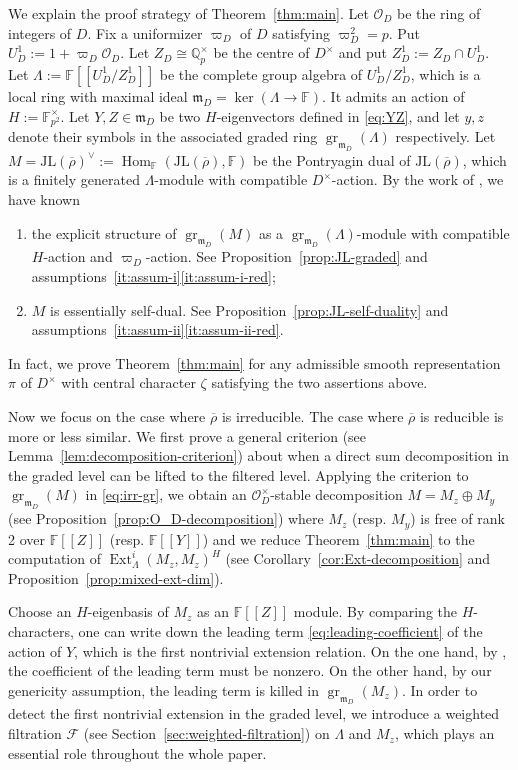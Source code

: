 \documentclass[11pt,a4paper]{article} %
\def\FF{\mathbb{F}}
\def\cF{\mathcal{F}}
\def\cO{\mathcal{O}}
\def\Ext{\operatorname{Ext}} %
\def\gr{\operatorname{gr}}
\def\Hom{\operatorname{Hom}}
\def\Qp{\mathbb{Q}_p}
\def\rhobar{\overline{\rho}}
\begin{document}
We explain the proof strategy of Theorem~\ref{thm:main}. Let $\cO_D$ be the ring of integers of $D$. Fix a uniformizer $\varpi_D$ of $D$ satisfying $\varpi_D^2=p$. Put $U_D^1:=1+\varpi_D\cO_D$. Let $Z_D\cong\Qp^\times$ be the centre of $D^{\times}$ and put $Z_D^1:=Z_D\cap U_D^1$. Let $\Lambda:=\FF[[U_D^1/Z_D^1]]$ be the complete group algebra of $U_D^1/Z_D^1$, which is a local ring with maximal ideal $\mathfrak{m}_D=\ker(\Lambda\rightarrow \mathbb{F})$. It admits an action of $H:=\FF_{p^2}^\times$. Let $Y,Z\in\mathfrak{m}_D$ be two $H$-eigenvectors defined in \eqref{eq:YZ}, and let $y,z$ denote their symbols in the associated graded ring $\gr_{\mathfrak{m}_D}(\Lambda)$ respectively. Let $M=\mathrm{JL}(\rhobar)^{\vee}:=\Hom_{\FF}(\mathrm{JL}(\rhobar),\FF)$ be the Pontryagin dual of $\mathrm{JL}(\rhobar)$, which is a finitely generated $\Lambda$-module with compatible $D^{\times}$-action. By the work of \cite{Koh17,HW24a,HW24b,HM26}, we have known
\begin{enumerate}[label=\alph*)]
    \item the explicit structure of $\gr_{\mathfrak{m}_D}(M)$ as a $\gr_{\mathfrak{m}_D}(\Lambda)$-module with compatible $H$-action and $\varpi_D$-action. See Proposition~\ref{prop:JL-graded} and assumptions~\ref{it:assum-i}\ref{it:assum-i-red};
    \item $M$ is essentially self-dual. See Proposition~\ref{prop:JL-self-duality} and assumptions~\ref{it:assum-ii}\ref{it:assum-ii-red}.
\end{enumerate}
In fact, we prove Theorem~\ref{thm:main} for any admissible smooth representation $\pi$ of $D^\times$ with central character $\zeta$ satisfying the two assertions above.

Now we focus on the case where $\rhobar$ is irreducible. The case where $\rhobar$ is reducible is more or less similar. We first prove a general criterion (see Lemma~\ref{lem:decomposition-criterion}) about when a direct sum decomposition in the graded level can be lifted to the filtered level. Applying the criterion to $\gr_{\mathfrak{m}_D}(M)$ in \eqref{eq:irr-gr}, we obtain an $\cO_D^{\times}$-stable decomposition $M=M_z\oplus M_y$ (see Proposition~\ref{prop:O_D-decomposition}) where $M_z$ (resp. $M_y$) is free of rank 2 over $\FF[[Z]]$ (resp. $\FF[[Y]]$) and we reduce Theorem~\ref{thm:main} to the computation of $\Ext^i_\Lambda(M_z,M_z)^H$ (see Corollary~\ref{cor:Ext-decomposition} and Proposition~\ref{prop:mixed-ext-dim}). 

Choose an $H$-eigenbasis of $M_z$ as an $\FF[[Z]]$ module. By comparing the $H$-characters, one can write down the leading term \eqref{eq:leading-coefficient} of the action of $Y$, which is the first nontrivial extension relation. On the one hand, by \cite[Proposition 2.21]{HW24a}, the coefficient of the leading term must be nonzero. On the other hand, by our genericity assumption, the leading term is killed in $\gr_{\mathfrak{m}_D}(M_z)$. In order to detect the first nontrivial extension in the graded level, we introduce a weighted filtration $\cF$ (see Section~\ref{sec:weighted-filtration}) on $\Lambda$ and $M_z$, which plays an essential role throughout the whole paper. 
\end{document}
